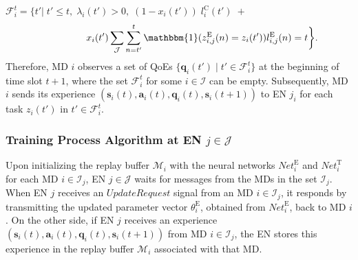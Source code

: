 \documentclass[10pt, journal,letterpaper]{IEEEtran}
\begin{document}
$\mathcal{F}_i^t =\bigg \{ t' \bigg|\; t' \leq t,\; \lambda_i(t')>0, \; (1 - x_i(t')) \; l_i^{\text{C}}(t') \; + $ \vspace{-3mm}
\begin{equation}
	\hspace{17mm} x_i(t')\sum\limits_{\mathcal{J}} \sum\limits_{n= t'}^{t}\mathbbm{1}(z_{i,j}^{\text{E}}(n)=z_i(t'))   l_{i,j}^{\text{E}}(n) = t \bigg\}.
	\label{28}  
	\nonumber
\end{equation}
Therefore, MD $i$ observes a set of QoEs $\{\boldsymbol{q}_i(t') \mid t' \in \mathcal{F}_i^t\}$ at the beginning of time slot $t+1$, where the set $\mathcal{F}_i^t$ for some $i \in \mathcal{I}$ can be empty. Subsequently, MD $i$ sends its experience $(\boldsymbol{s}_i(t), \boldsymbol{a}_i(t), \boldsymbol{q}_i(t), \boldsymbol{s}_i(t+1))$ to EN $j_i$ for each task $z_i(t')$ in $t' \in \mathcal{F}_i^t$.





\subsubsection{Training Process Algorithm at EN $j \in \mathcal{J}$}
Upon initializing the replay buffer $\mathcal{M}_i$ with the neural networks $\textit{Net}_i^{\text{E}}$ and $\textit{Net}_i^{\text{T}}$ for each MD $i \in \mathcal{I}_j$, EN $j \in \mathcal{J}$ waits for messages from the MDs in the set $\mathcal{I}_j$. When EN $j$ receives an $\textit{UpdateRequest}$ signal from an MD $i \in \mathcal{I}_j$, it responds by transmitting the updated parameter vector $\theta^{\text{E}}_i$, obtained from $\textit{Net}_i^{\text{E}}$, back to MD $i$. On the other side, if EN $j$ receives an experience $(\boldsymbol{s}_i(t), \boldsymbol{a}_i(t), \boldsymbol{q}_i(t), \boldsymbol{s}_i(t+1))$ from MD $i \in \mathcal{I}_j$, the EN stores this experience in the replay buffer $\mathcal{M}_i$ associated with that MD. %
\end{document}
